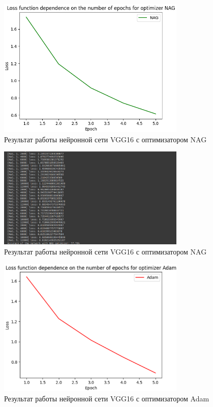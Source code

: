 \documentclass[a4paper, 14pt]{extarticle}
\begin{document}
\begin{figure}[!htb]
	\centering
	\includegraphics[width=0.8\textwidth]{img8}
\caption{Результат работы нейронной сети VGG16 с оптимизатором NAG}
\label{fig:img8}
\end{figure}

\begin{figure}[!htb]
	\centering
	\includegraphics[width=0.8\textwidth]{img9}
\caption{Результат работы нейронной сети VGG16 с оптимизатором NAG}
\label{fig:img9}
\end{figure}

\begin{figure}[!htb]
	\centering
	\includegraphics[width=0.8\textwidth]{img10}
\caption{Результат работы нейронной сети VGG16 с оптимизатором Adam}
\label{fig:img10}
\end{figure}
\end{document}
